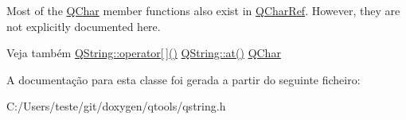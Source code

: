 Most of the \hyperlink{class_q_char}{Q\-Char} member functions also exist in \hyperlink{class_q_char_ref}{Q\-Char\-Ref}. However, they are not explicitly documented here.

\begin{DoxySeeAlso}{Veja também}
\hyperlink{class_q_string_aaa5543be6fc9dffc6354e4e15a80405c}{Q\-String\-::operator\mbox{[}$\,$\mbox{]}()} \hyperlink{class_q_string_aeab82c39fe3254c6b27681d55419885f}{Q\-String\-::at()} \hyperlink{class_q_char}{Q\-Char} 
\end{DoxySeeAlso}


A documentação para esta classe foi gerada a partir do seguinte ficheiro\-:\begin{DoxyCompactItemize}
\item 
C\-:/\-Users/teste/git/doxygen/qtools/qstring.\-h\end{DoxyCompactItemize}
